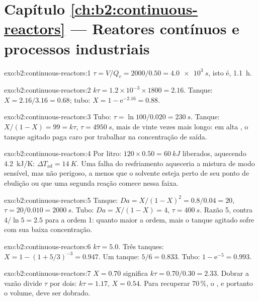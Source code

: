 \section*{Capítulo \ref{ch:b2:continuous-reactors} --- Reatores contínuos e processos industriais}

\begin{solution}{exo:b2:continuous-reactors:1}
$\tau = V/Q_v = 2000/0.50 = \qty{4.0e3}{s}$, isto é, \qty{1.1}{h}.
\end{solution}

\begin{solution}{exo:b2:continuous-reactors:2}
$k\tau = 1.2 \times 10^{-3} \times 1800 = 2.16$. Tanque: $X = 2.16/3.16 = 0.68$;
tubo: $X = 1 - \mathrm e^{-2.16} = 0.88$.
\end{solution}

\begin{solution}{exo:b2:continuous-reactors:3}
Tubo: $\tau = \ln 100/0.020 = \qty{230}{s}$. Tanque: $X/(1 - X) = 99 = k\tau$,
$\tau = \qty{4950}{s}$, mais de vinte vezes mais longo: em alta , o
tanque agitado paga caro por trabalhar na concentração de saída.
\end{solution}

\begin{solution}{exo:b2:continuous-reactors:4}
Por litro: $120 \times 0.50 = \qty{60}{kJ}$ liberados, aquecendo
\qty{4.2}{kJ/K}: $\Delta T_{\text{ad}} = \qty{14}{K}$. Uma falha do resfriamento
aqueceria a mistura de modo sensível, mas não perigoso, a menos que o solvente
esteja perto de seu ponto de ebulição ou que uma segunda reação comece nessa faixa.
\end{solution}

\begin{solution}{exo:b2:continuous-reactors:5}
Tanque: $Da = X/(1 - X)^2 = 0.8/0.04 = 20$, $\tau = 20/0.010 = \qty{2000}{s}$.
Tubo: $Da = X/(1 - X) = 4$, $\tau = \qty{400}{s}$. Razão 5, contra $4/\ln 5 =
2.5$ para a ordem 1: quanto maior a ordem, mais o tanque agitado sofre com
sua baixa concentração.
\end{solution}

\begin{solution}{exo:b2:continuous-reactors:6}
$k\tau = 5.0$. Três tanques: $X = 1 - (1 + 5/3)^{-3} = 0.947$. Um tanque: $5/6 =
0.833$. Tubo: $1 - \mathrm e^{-5} = 0.993$.
\end{solution}

\begin{solution}{exo:b2:continuous-reactors:7}
$X = 0.70$ significa $k\tau = 0.70/0.30 = 2.33$. Dobrar a vazão divide $\tau$
por dois: $k\tau = 1.17$, $X = 0.54$. Para recuperar 70\,\%, o , e portanto o volume, deve ser dobrado.
\end{solution}

